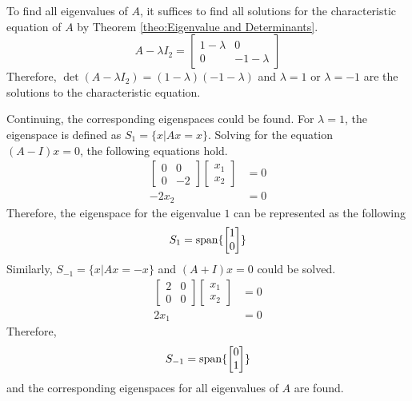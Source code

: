 \documentclass[../main.tex]{subfiles}
\begin{document}
\begin{solution}
To find all eigenvalues of $A$, it suffices to find all solutions for
the characteristic equation of $A$ by Theorem \ref{theo:Eigenvalue and
Determinants}.
\[
A - \lambda I_2 =
\begin{bmatrix}
    1 - \lambda & 0 \\
    0           & -1 - \lambda
\end{bmatrix}
\]
Therefore, $\det(A - \lambda I_2) = (1 - \lambda)(-1 - \lambda)$
and $\lambda = 1$ or $\lambda = -1$ are the solutions to the
characteristic equation.

Continuing, the corresponding eigenspaces could be found. For
$\lambda = 1$, the eigenspace is defined as $S_1 = \{ x | Ax = x \}$.
Solving for the equation $(A - I)x = 0$, the following equations hold.
\begin{align*}
    \begin{bmatrix}
        0 & 0 \\
        0 & -2
    \end{bmatrix}
    \begin{bmatrix}
        x_1 \\
        x_2
    \end{bmatrix}
    &= 0 \\
    -2x_2 &= 0
\end{align*}
Therefore, the eigenspace for the eigenvalue $1$ can be represented
as the following
\[
S_1 =
\operatorname{span}\{
    \begin{bmatrix}
        1 \\
        0
    \end{bmatrix}
\}
\]
Similarly, $S_{-1} = \{ x | Ax = -x \}$ and $(A + I)x = 0$ could
be solved.
\begin{align*}
    \begin{bmatrix}
        2 & 0 \\
        0 & 0
    \end{bmatrix}
    \begin{bmatrix}
        x_1 \\
        x_2
    \end{bmatrix}
    &= 0 \\
    2x_1 &= 0
\end{align*}
Therefore,
\[
S_{-1} =
\operatorname{span}\{
    \begin{bmatrix}
        0 \\
        1
    \end{bmatrix}
\}
\]
and the corresponding eigenspaces for all eigenvalues of $A$ are
found.
\end{solution}
\end{document}
